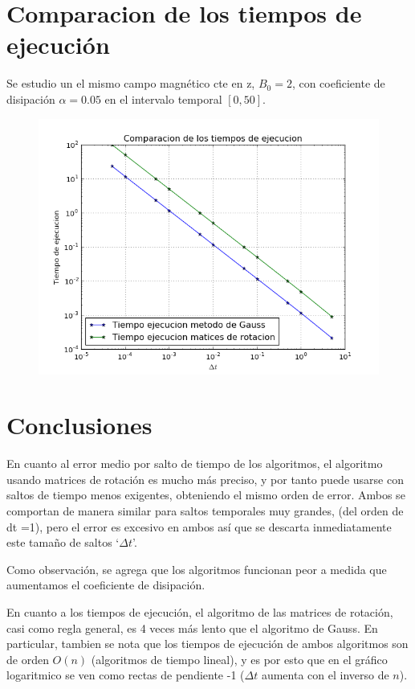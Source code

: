 \documentclass[a4paper, 11pt, spanish]{article}
\begin{document}
\section{Comparacion de los tiempos de ejecución}
Se estudio un el mismo campo magnético cte en z, $B_0 = 2$, con coeficiente de disipación $\alpha = 0.05$ en el intervalo temporal $[0,50]$.

\begin{figure}[!ht]
\centering
\includegraphics[scale=0.5]{img/comparacion_tiempos_ejecucion.png}
\end{figure}
\newpage
\section{Conclusiones}
En cuanto al error medio por salto de tiempo de los algoritmos, el algoritmo usando matrices de rotación es mucho más preciso, y por tanto puede usarse con saltos de tiempo menos exigentes, obteniendo el mismo orden de error. Ambos se comportan de manera similar para saltos temporales muy grandes, (del orden de dt =1), pero el error es excesivo en ambos así que se descarta inmediatamente este tamaño de saltos `$\Delta t$'.

Como observación, se agrega que los algoritmos funcionan peor a medida que aumentamos el coeficiente de disipación.

En cuanto a los tiempos de ejecución, el algoritmo de las matrices de rotación, casi como regla general, es 4 veces más lento que el algoritmo de Gauss. En particular, tambien se nota que los tiempos de ejecución de ambos algoritmos son de orden $O(n)$ (algoritmos de tiempo lineal), y es por esto que en el gráfico logaritmico se ven como rectas de pendiente -1 ($\Delta t $ aumenta con el inverso de $n$).
\end{document}
